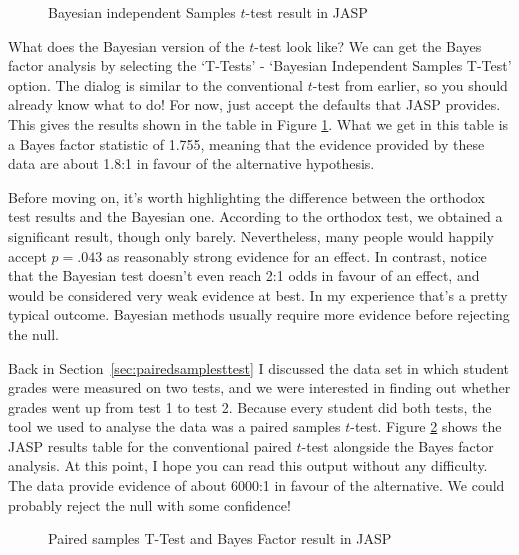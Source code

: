 \begin{figure}[ht]
\begin{center}
\caption{Bayesian independent Samples $t$-test result in JASP}
\label{fig:bayes1}
\HR
\end{center}
\end{figure}

What does the Bayesian version of the $t$-test look like? We can get the Bayes factor analysis by selecting the `T-Tests' - `Bayesian Independent Samples T-Test' option.  The dialog is similar to the conventional $t$-test from earlier, so you should already know what to do!  For now, just accept the defaults that JASP provides. This gives the results shown in the table in Figure \ref{fig:bayes1}. What we get in this table is a Bayes factor statistic of 1.755, meaning that the evidence provided by these data are about 1.8:1 in favour of the alternative hypothesis. 

Before moving on, it's worth highlighting the difference between the orthodox test results and the Bayesian one. According to the orthodox test, we obtained a significant result, though only barely. Nevertheless, many people would happily accept $p=.043$ as reasonably strong evidence for an effect. In contrast, notice that the Bayesian test doesn't even reach 2:1 odds in favour of an effect, and would be considered very weak evidence at best. In my experience that's a pretty typical outcome. Bayesian methods usually require more evidence before rejecting the null.


Back in Section~\ref{sec:pairedsamplesttest} I discussed the  data set in which student grades were measured on two tests, and we were interested in finding out whether grades went up from test 1 to test 2. Because every student did both tests, the tool we used to analyse the data was a paired samples $t$-test. Figure \ref{fig:bayes3} shows the JASP results table for the conventional paired $t$-test alongside the Bayes factor analysis. At this point, I hope you can read this output without any difficulty. The data provide evidence of about 6000:1 in favour of the alternative. We could probably reject the null with some confidence!

\begin{figure}[ht]
\begin{center}
\caption{Paired samples T-Test and Bayes Factor result in JASP}
\label{fig:bayes3}
\HR
\end{center}
\end{figure}


